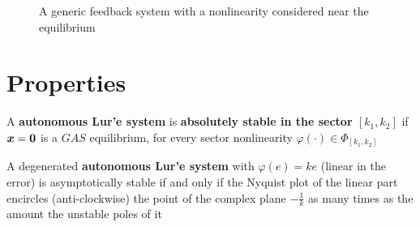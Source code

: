 \begin{figure}[htb]
    \centering
    \caption{A generic feedback system with a nonlinearity considered near the equilibrium}
    \label{fig:generic-feedback-system-equilibrium}
\end{figure}

\section{Properties}

\begin{definition}
    A \textbf{autonomous Lur'e system} is \textbf{absolutely stable in the sector $[k_1,k_2]$} if $\boldsymbol{x}=\boldsymbol{0}$ is a $GAS$ equilibrium, for every sector nonlinearity $\varphi(\cdot) \in \Phi_{[k_1,k_2]}$
\end{definition}

\begin{theorem}\label{thm:nyquist}
A degenerated \textbf{autonomous Lur'e system} with $\varphi(e) = k e$ (linear in the error) is asymptotically stable if and only if the Nyquist plot of the linear part encircles (anti-clockwise) the point of the complex plane $-\frac{1}{k}$ as many times as the amount the unstable poles of it
\end{theorem}

